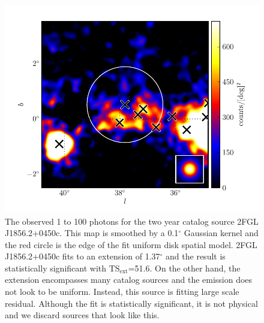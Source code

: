 \documentclass[12pt,preprint]{aastex}
\newcommand{\gev}{\text{GeV}\xspace}
\newcommand{\tsext}{{\ensuremath{\text{TS}_\text{ext}}}\xspace}
\renewcommand{\deg}{\ensuremath{^\circ}\xspace}
\begin{document}
\clearpage
\begin{figure}
  \begin{center}
    \includegraphics{source_plots/example_bad_fit.pdf}
    \caption{
    The observed 1 \gev to 100 \gev photons for the
    two year catalog source 2FGL J1856.2+0450c. This map is smoothed by
    a 0.1\deg Gaussian kernel and the red circle is the edge of
    the fit uniform disk spatial model.  2FGL J1856.2+0450c fits to an
    extension of 1.37\deg and the result is statistically significant
    with \tsext=51.6. On the other hand, the extension encompasses many
    catalog sources and the emission does not look to be uniform. Instead,
    this source is fitting large scale residual. Although the fit is 
    statistically significant, it is not physical and we discard sources
    that look like this.
    }
    \label{example_bad_fit}
  \end{center}
\end{figure}
\end{document}
